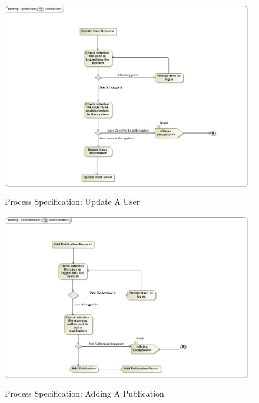\documentclass[a4paper]{article}
\begin{document}
	\begin{figure}[H]
	    \centering
	    \includegraphics[width=\textwidth]{../Assignment1/UpdateUser.jpg}
	    \caption{Process Specification: Update A User}
	\end{figure}
		\begin{figure}[H]
	    \centering
	    \includegraphics[width=\textwidth]{../Assignment1/AddPublication.jpg}
	    \caption{Process Specification: Adding A Publication}
	\end{figure}
\end{document}
